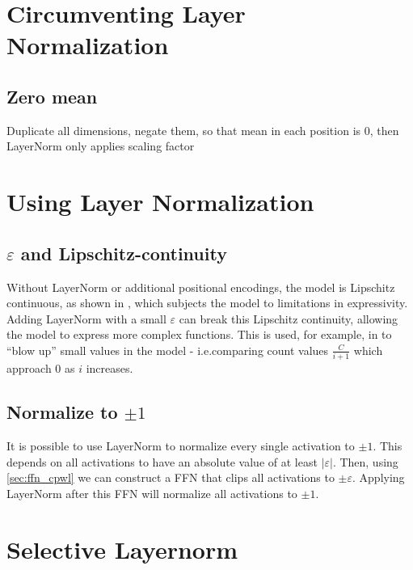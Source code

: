 
\section{Circumventing Layer Normalization}

\subsection{Zero mean}

Duplicate all dimensions, negate them, so that mean in each position is $0$, then LayerNorm only applies scaling factor


\section{Using Layer Normalization}

\subsection{$\varepsilon$ and Lipschitz-continuity}

Without LayerNorm or additional positional encodings, the model is Lipschitz continuous, as shown in \citet{hahn-2020-theoretical}, which subjects the model to limitations in expressivity. Adding LayerNorm with a small $\varepsilon$ can break this Lipschitz continuity, allowing the model to express more complex functions. This is used, for example, in \citet{yang2024counting} to ``blow up'' small values in the model - i.e.comparing count values $\frac{C}{i+1}$ which approach $0$ as $i$ increases.

\subsection{Normalize to $\pm1$}

It is possible to use LayerNorm to normalize every single activation to $\pm1$. This depends on all activations to have an absolute value of at least $|\varepsilon|$. Then, using \ref{sec:ffn_cpwl} we can construct a FFN that clips all activations to $\pm\varepsilon$. Applying LayerNorm after this FFN will normalize all activations to $\pm1$.

\section{Selective Layernorm}
\label{sec:ln_selective}



